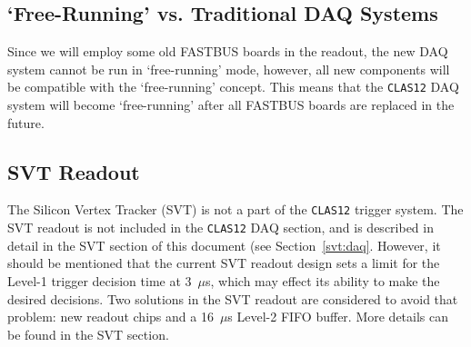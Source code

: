 \subsection{`Free-Running' vs. Traditional DAQ Systems}

Since we will employ some old FASTBUS boards in the readout, the new
DAQ system cannot be run in `free-running' mode, however, all new components 
will be compatible with the `free-running' concept.  This means that the
{\tt CLAS12} DAQ system will become `free-running' after all FASTBUS boards 
are replaced in the future.

\subsection{SVT Readout}

The Silicon Vertex Tracker (SVT) is not a part of the {\tt CLAS12} trigger 
system.  The SVT readout is not included in the {\tt CLAS12} DAQ section, 
and is described in detail in the SVT section of this document (see
Section~\ref{svt:daq}.  However, it should be mentioned that the current SVT 
readout design sets a limit for the Level-1 trigger decision time at 3~$\mu$s, 
which may effect its ability to make the desired decisions.  Two solutions in 
the SVT readout are considered to avoid that problem: new readout chips and
a 16~$\mu$s Level-2 FIFO buffer.  More details can be found in the SVT section.










